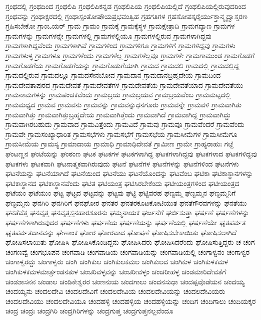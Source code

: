 {ಗ್ರಂಥದಲ್ಲಿ
ಗ್ರಂಥದಿಂದ
ಗ್ರಂಥಲಿಪಿ
ಗ್ರಂಥಲಿಪಿಕನ್ನಡ
ಗ್ರಂಥಲಿಪಿಯ
ಗ್ರಂಥಲಿಪಿಯಲ್ಲಿದೆ
ಗ್ರಂಥಲಿಪಿಯಲ್ಲಿರುವುದರಿಂದ
ಗ್ರಂಥವನ್ನು
ಗ್ರಂಥಾಕ್ಷರದಲ್ಲಿ
ಗ್ರಂಥಾಸ್ಸಂತೋಷೌಯಪ್ರಭವಂತ್ವಿಹ
ಗ್ರಹಗತಿಗಳ
ಗ್ರಹಸೋಪಸ್ಕರೈರ್ಯುಕ್ತಾನ್ಮೃದ್ವಾಸ್ತರಣ
ಗ್ರಹಿಸಬೇಕೋ
ಗ್ರಾಂಒಯರ್
ಗ್ರಾಮ
ಗ್ರಾಮಂ
ಗ್ರಾಮಕ್ಕೆ
ಗ್ರಾಮಕ್ಕೆಸ್ಥಳ
ಗ್ರಾಮಕ್ಷೇತ್ರಾದಿ
ಗ್ರಾಮಗದ್ಯಾಣ
ಗ್ರಾಮಗಳ
ಗ್ರಾಮಗಳನ್ನು
ಗ್ರಾಮಗಳನ್ನೇ
ಗ್ರಾಮಗಳಲ್ಲಿ
ಗ್ರಾಮಗಳಲ್ಲಿಯೂ
ಗ್ರಾಮಗಳಲ್ಲಿರುವ
ಗ್ರಾಮಗಳಾಗಿದ್ದವು
ಗ್ರಾಮಗಳಾಗಿದ್ದವೆಂದು
ಗ್ರಾಮಗಳಾಗಿವೆ
ಗ್ರಾಮಗಳಿಂದ
ಗ್ರಾಮಗಳಿಗೂ
ಗ್ರಾಮಗಳಿಗೆ
ಗ್ರಾಮಗಳಿದ್ದವು
ಗ್ರಾಮಗಳು
ಗ್ರಾಮಗಳುಳ್ಳ
ಗ್ರಾಮಗಳೂ
ಗ್ರಾಮಗಳೆಂದು
ಗ್ರಾಮಗಳೆಲ್ಲ
ಗ್ರಾಮಗಳೆಲ್ಲವೂ
ಗ್ರಾಮಗಳೇ
ಗ್ರಾಮಗಾಮುಂಡ
ಗ್ರಾಮಗೊಡಗೆ
ಗ್ರಾಮಗೊಡಗೆಯ
ಗ್ರಾಮಗೊಡಗೆಯನ್ನು
ಗ್ರಾಮಗೊಡುಗೆಯಾಗಿ
ಗ್ರಾಮದ
ಗ್ರಾಮದಲಿ
ಗ್ರಾಮದಲ್ಲಿ
ಗ್ರಾಮದಲ್ಲಿದ್ದ
ಗ್ರಾಮದಲ್ಲಿರುವ
ಗ್ರಾಮದಲ್ಲೂ
ಗ್ರಾಮದಸೇನಬೋವ
ಗ್ರಾಮದಾನ
ಗ್ರಾಮದಾನಬ್ರಹ್ಮದೇಯ
ಗ್ರಾಮದಿಂದ
ಗ್ರಾಮದೇವತಾಪುರದ
ಗ್ರಾಮದೇವತೆ
ಗ್ರಾಮದೇವತೆಗಳ
ಗ್ರಾಮದೇವತೆಯ
ಗ್ರಾಮದೇವತೆಯಾದ
ಗ್ರಾಮದೇವತೆಯು
ಗ್ರಾಮನಾಮಗಳನ್ನು
ಗ್ರಾಮಪಂಚಕವೆಂದು
ಗ್ರಾಮಬ್ರಯ
ಗ್ರಾಮಬ್ರಯವ
ಗ್ರಾಮಬ್ರಯವೆಂಬ
ಗ್ರಾಮಮಟ್ಟದಲ್ಲಿ
ಗ್ರಾಮಮಧ್ಯದ
ಗ್ರಾಮವ
ಗ್ರಾಮವನು
ಗ್ರಾಮವನ್ನು
ಗ್ರಾಮವನ್ನುಧನಗೂರು
ಗ್ರಾಮವನ್ನೇ
ಗ್ರಾಮವಳಿ
ಗ್ರಾಮವಾಗಿತು
ಗ್ರಾಮವಾಗಿತ್ತು
ಗ್ರಾಮವಾಗಿತ್ತುಬ್ರಹ್ಮದೇಯ
ಗ್ರಾಮವಾಗಿತ್ತೆಂದು
ಗ್ರಾಮವಾಗಿದೆ
ಗ್ರಾಮವಾಗಿದ್ದ
ಗ್ರಾಮವಾಗಿದ್ದು
ಗ್ರಾಮವಾಗಿರಬಹುದು
ಗ್ರಾಮವಾದ
ಗ್ರಾಮವಿತ್ತೆಂದು
ಗ್ರಾಮವಿದೆ
ಗ್ರಾಮವು
ಗ್ರಾಮವೂ
ಗ್ರಾಮವೆಂದರೆ
ಗ್ರಾಮವೆಂದು
ಗ್ರಾಮವೇ
ಗ್ರಾಮಸಂಖ್ಯಾಧಾರಿತ
ಗ್ರಾಮಸಭೆಗಳು
ಗ್ರಾಮಸಭೆಗೆ
ಗ್ರಾಮಸಭೆಯ
ಗ್ರಾಮಸೀಮೆಗಳ
ಗ್ರಾಮಸೀಮೆಗೂ
ಗ್ರಾಮಸೀಮೆಯ
ಗ್ರಾಮಸ್ಯ
ಗ್ರಾಮಾದಾಯ
ಗ್ರಾಮಾಧಿ
ಗ್ರಾಮಾಧಿದೇವತೆ
ಗ್ರಾಮೀಣ
ಗ್ರಾಮೇ
ಗ್ರಾಹ್ಯರಾಹುಃ
ಗೞ್ದೆ
ಘಂಟಣ್ಣನ
ಘಂಟೆಯನ್ನು
ಘಂಠಂಣ
ಘಟಕ
ಘಟಕಗಳ
ಘಟಕಗಳಾಗಿದ್ದ
ಘಟಕಗಳಾಗಿದ್ದವು
ಘಟಕಗಳಾದ
ಘಟಕಗಳಿದ್ದವು
ಘಟಕಗಳು
ಘಟಕವಾಗಿ
ಘಟನಾತ್ಮಕವಾಗಿರುವುದು
ಘಟನೆ
ಘಟನೆಗಳ
ಘಟನೆಗಳನ್ನು
ಘಟನೆಗಳಿಂದ
ಘಟನೆಗಳು
ಘಟನೆಯನ್ನು
ಘಟನೆಯಾಗಿದೆ
ಘಟನೆಯಿಂದ
ಘಟನೆಯು
ಘಟನೆಯೊಂದನ್ನು
ಘಟವೆಂಬ
ಘಟಿಕಾ
ಘಟಿಕಾಸ್ಥಾನಗಳನ್ನು
ಘಟಿಕಾಸ್ಥಾನದ
ಘಟಿಕಾಸ್ಥಾನವೆಂದು
ಘಟಿತ
ಘಟಿಯಂತ್ರ
ಘಟಿಸಿರಬೇಕೆಂದು
ಘಟೀಯಂತ್ರಗಳಿಂದ
ಘಟೀಯಂತ್ರದ
ಘಟೆಯಂ
ಘಟೆಯುಂ
ಘಟ್ಟ
ಘಟ್ಟದ
ಘಟ್ಟವನ್ನು
ಘಟ್ಟವು
ಘಟ್ಟಿ
ಘಟ್ಟಿವರಹ
ಘಣ್ಟಮ್ಮ
ಘಣ್ಟಮ್ಮನ
ಘಣ್ಟಮ್ಮನಿಗೆ
ಘಣ್ಟಮ್ಮನು
ಘನಗಿರಿ
ಘನಗಿರಿಗೆ
ಘನಘೋರ
ಘನತರ
ಘನತರಕೂಟಕೋಟಿಯುತ
ಘನತೆಗೌರವಗಳನ್ನು
ಘನತೆಯು
ಘನತೆವೆತ್ತ
ಘನವೃತ್ತ
ಘನವೃತ್ತಸ್ತನಹಾರಶೂರನು
ಘಮ್ಮನಾಯಕ
ಘರ್ಜನೆಗೆ
ಘರ್ಜಿಸುತ್ತಾ
ಘರ್ಷಣೆ
ಘರ್ಷಣೆಗಳನ್ನು
ಘರ್ಷಣೆಗಳಾಗಿರುವುದರ
ಘರ್ಷಣೆಗಳು
ಘರ್ಷಣೆಯ
ಘರ್ಷಣೆಯನ್ನು
ಘರ್ಷಣೆಯಲ್ಲಿ
ಘರ್ಷಣೆಯೇ
ಘೃತಪರ್ವತ
ಘೃತಪರ್ವತದಾನವನ್ನು
ಘೇಣಾಂಕ
ಘೋರ
ಘೋರವಾದ
ಘೋಷಣೆ
ಘೋಷಿಸಬೇಕಾಯಿತು
ಘೋಷಿಸಲಾಗಿದೆ
ಘೋಷಿಸಲಾಯಿತು
ಘೋಷಿಸಿ
ಘೋಷಿಸಿಕೊಂಡಿದ್ದನು
ಘೋಷಿಸಿದರು
ಘೋಷಿಸಿದರೆಂದು
ಘೋಷಿಸುತ್ತಿದ್ದರು
ಚ
ಚಂಗ
ಚಂಗಣವ್ವೆ
ಚಂಗಭೂಪನ
ಚಂಗವಾಡಿ
ಚಂಗವಾಡಿಯ
ಚಂಗವಾಡಿಯನ್ನು
ಚಂಗವಾಡಿಯಲ್ಲಿ
ಚಂಗಾಳ್ವನಂ
ಚಂಗಾಳ್ವರ
ಚಂಗಾಳ್ವರದ್ದು
ಚಂಗಾಳ್ವರು
ಚಂಗಿ
ಚಂಗಿಕುಲ
ಚಂಗಿಕುಲಕಮಲ
ಚಂಗಿಕುಲದ
ಚಂಗಿಕುಳ
ಚಂಗಿಕುಳಕಮಳ
ಚಂಗಿಕುಳಕಮಳಮಾರ್ತ್ರಂಡನತುಳ
ಚಂಚರಿವಳ್ಳವನ್ನು
ಚಂಚರೀವಳ್ಳಂ
ಚಂಚರೀಹಳ್ಳ
ಚಂಡಮಾರಿದೇವತೆಗೆ
ಚಂಡಶಾಸನನ
ಚಂಡಾಲ
ಚಂಡಿಕೇಶ್ವರರ
ಚಂಣನುಯ
ಚಂದಗಾಲು
ಚಂದನಸುಧಾ
ಚಂದಪ್ಪವೊಡೆಯನ
ಚಂದಯ್ಯ
ಚಂದಯ್ಯನು
ಚಂದಲದೇವಿ
ಚಂದಲದೇವಿಗೆ
ಚಂದಲದೇವಿಯ
ಚಂದಲದೇವಿಯನ್ನು
ಚಂದಲದೇವಿಯರು
ಚಂದಲದೇವಿಯು
ಚಂದಲದೇವಿಯೂ
ಚಂದಹಳ್ಳಿ
ಚಂದಹಳ್ಳಿಯ
ಚಂದಹಳ್ಳಿಯನ್ನು
ಚಂದಿಗ
ಚಂದಿಗಾಲು
ಚಂದಿಯಕ್ಕರ
ಚಂದ್ರ
ಚಂದ್ರಃ
ಚಂದ್ರಗಿರಿ
ಚಂದ್ರಗಿರಿಗಳನ್ನು
ಚಂದ್ರಗುಪ್ತ
ಚಂದ್ರಗುಪ್ತನಲ್ಲವೆಂದೂ
}
